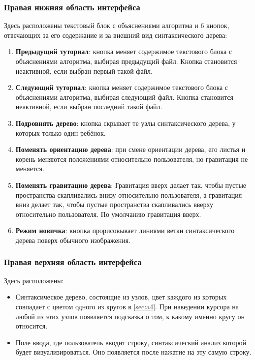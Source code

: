 \documentclass[a4paper,12pt]{article}
\begin{document}
  \subsubsection{Правая нижняя область интерфейса}
  \label{sec:a2}
  Здесь расположены текстовый блок с объяснениями алгоритма и 6 кнопок,
  отвечающих за его содержание и за внешний вид синтаксического дерева: 
  \begin{enumerate}
    \item \textbf{Предыдущий туториал}: кнопка меняет содержимое текстового блока с объяснениями алгоритма, выбирая предыдущий файл.
    Кнопка становится неактивной, если выбран первый такой файл.
    \item \textbf{Следующий туториал}: кнопка меняет содержимое текстового блока с объяснениями алгоритма, выбирая следующий файл.
    Кнопка становится неактивной, если выбран последний такой файл.
    \item \textbf{Подровнять дерево}: кнопка скрывает те узлы синтаксического дерева, у которых только один ребёнок.
    \item \textbf{Поменять ориентацию дерева}: при смене ориентации дерева,
    его листья и корень меняются положениями относительно пользователя,
    но гравитация не меняется. 
    \item \textbf{Поменять гравитацию дерева}:
    Гравитация вверх делает так, чтобы пустые пространства скапливались внизу относительно пользователя,
    а гравитация вниз делает так, чтобы пустые пространства скапливались вверху относительно пользователя.
    По умолчанию гравитация вверх. 
    \item \textbf{Режим новичка}: кнопка прорисовывает линиями ветки синтаксического дерева поверх обычного изображения.
  \end{enumerate}

  \subsubsection{Правая верхняя область интерфейса}
  \label{sec:a3}
  Здесь расположены:
  \begin{itemize}
    \item Синтаксическое дерево, состоящие из узлов, цвет каждого из которых совпадает с цветом одного из кругов в \autoref{sec:a4}.
    При наведении курсора на любой из этих узлов появляется подсказка о том, к какому именно кругу он относится.
    \item Поле ввода, где пользователь вводит строку, синтаксический анализ которой будет визуализироваться.
    Оно появляется после нажатие на эту самую строку.
  \end{itemize}
\end{document}
